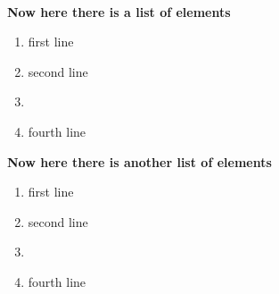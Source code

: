 \documentclass[12pt, twoside]{article}
\begin{document}
\lipsum[1] \\

\textbf{Now here there is a list of elements}

\begin{enumerate}[topsep=1in, itemsep=0.5in, leftmargin=1in, rightmargin=1in, labelsep=0.1in]
	\item first line
	\item second line
	\item \lipsum[2]
	\item fourth line
\end{enumerate}

\textbf{Now here there is another list of elements}

\begin{enumerate}[topsep=1in, itemindent=1in]
	\item first line
	\item second line
	\item \lipsum[3]
	\item fourth line
\end{enumerate}

\lipsum[3]

\lipsum[4]
\end{document}
